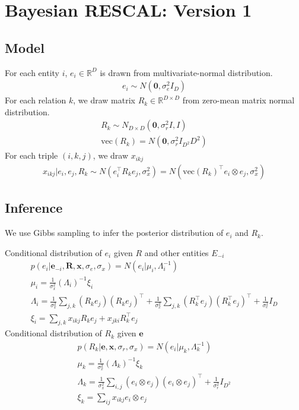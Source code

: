 \documentclass{article}
\theoremstyle{definition}
\begin{document}
 
\section{Bayesian RESCAL: Version 1}
\subsection{Model}

For each entity $i$, $e_i \in \mathbb{R}^{D}$ is drawn from multivariate-normal distribution.
\begin{align}
e_i \sim {N}(\mathbf{0}, \sigma_e^2{I}_D)
\end{align}
For each relation $k$, we draw matrix $R_k \in \mathbb{R}^{D\times D}$ from zero-mean matrix normal distribution.
\begin{align}
R_k \sim {N}_{D \times D}(\mathbf{0}, \sigma_r^2{I}, {I}) \\
\text{vec}(R_k) = N(\mathbf{0}, \sigma_r^2 I_{D^2}{D^2})
\end{align}
For each triple $(i,k,j)$, we draw $x_{ikj}$ 
\begin{align}
x_{ikj} |e_i, e_j, R_k \sim N(e_i^{\top} R_k e_j, \sigma_x^2) = N(\text{vec}(R_k)^{\top} e_i \otimes e_j, \sigma_x^2)
\end{align}

\subsection{Inference}
We use Gibbs sampling to infer the posterior distribution of $e_i$ and $R_k$.

Conditional distribution of $e_i$ given $R$ and other entities $E_{-i}$
\begin{align}
p(e_i |\mathbf{e}_{-i}, \mathbf{R}, \mathbf{x}, \sigma_e, \sigma_x) = N(e_i | \mu_i, \Lambda_i^{-1})\\
\mu_i = \frac{1}{\sigma_x^2}(\Lambda_i)^{-1}\xi_i \\
\Lambda_i = \frac{1}{\sigma_x^2} \sum_{j,k} (R_k e_j)(R_k e_j)^\top + \frac{1}{\sigma_x^2} \sum_{j,k} (R_k^\top e_j)(R_k^\top e_j)^\top+ \frac{1}{\sigma_e^2} {I}_D\\
\xi_i = \sum_{j,k} x_{ikj} R_{k} e_{j} + x_{jki} R_{k}^\top e_{j}
\end{align}
Conditional distribution of $R_k$ given $\mathbf{e}$
\begin{align}
p(R_k|\mathbf{e}, \mathbf{x}, \sigma_r, \sigma_x)  = N(e_i | \mu_k, \Lambda_k^{-1})\\
\mu_k = \frac{1}{\sigma_x^2}(\Lambda_k)^{-1}\xi_k \\
\Lambda_k = \frac{1}{\sigma_x^2} \sum_{i,j} (e_i \otimes e_j)(e_i \otimes e_j)^\top + \frac{1}{\sigma_r^2} {I}_{D^2}\\
\xi_k = \sum_{ij} x_{ikj} e_{i} \otimes e_{j}
\end{align}



\end{document}
